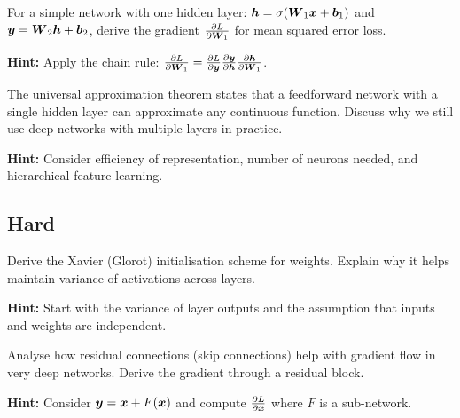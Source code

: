 \begin{problem}
For a simple network with one hidden layer: $\boldsymbol{h} = \sigma(\boldsymbol{W}_1\boldsymbol{x} + \boldsymbol{b}_1)$ and $\boldsymbol{y} = \boldsymbol{W}_2\boldsymbol{h} + \boldsymbol{b}_2$, derive the gradient $\frac{\partial L}{\partial \boldsymbol{W}_1}$ for mean squared error loss.

\textbf{Hint:} Apply the chain rule: $\frac{\partial L}{\partial \boldsymbol{W}_1} = \frac{\partial L}{\partial \boldsymbol{y}} \frac{\partial \boldsymbol{y}}{\partial \boldsymbol{h}} \frac{\partial \boldsymbol{h}}{\partial \boldsymbol{W}_1}$.
\end{problem}

\begin{problem}
The universal approximation theorem states that a feedforward network with a single hidden layer can approximate any continuous function. Discuss why we still use deep networks with multiple layers in practice.

\textbf{Hint:} Consider efficiency of representation, number of neurons needed, and hierarchical feature learning.
\end{problem}

\subsection*{Hard}

\begin{problem}
Derive the Xavier (Glorot) initialisation scheme for weights. Explain why it helps maintain variance of activations across layers.

\textbf{Hint:} Start with the variance of layer outputs and the assumption that inputs and weights are independent.
\end{problem}

\begin{problem}
Analyse how residual connections (skip connections) help with gradient flow in very deep networks. Derive the gradient through a residual block.

\textbf{Hint:} Consider $\boldsymbol{y} = \boldsymbol{x} + F(\boldsymbol{x})$ and compute $\frac{\partial L}{\partial \boldsymbol{x}}$ where $F$ is a sub-network.
\end{problem}

